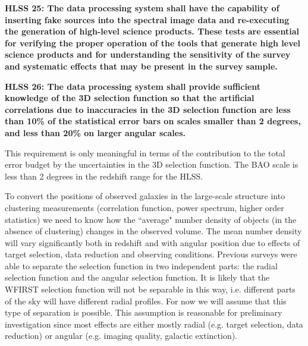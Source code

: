 \noindent
 {\bf HLSS 25: The data processing system shall have the capability of inserting fake
 sources into the spectral image data and re-executing the generation of
 high-level science products. These tests are essential for verifying the proper
 operation of the tools that generate high level science products and for
 understanding the sensitivity of the survey and systematic effects that may be
 present in the survey sample. }

 \noindent
 {\bf HLSS 26: The data processing system shall provide sufficient knowledge of the 3D
 selection function so that the artificial correlations due to inaccuracies in
 the 3D selection function are less than 10\% of the statistical error bars on
 scales smaller than 2 degrees, and less than 20\% on larger angular scales.}

 This requirement is only meaningful in terms of the contribution to the total
 error budget by the uncertainties in the 3D selection function. The BAO scale is
 less than 2 degrees in the redshift range for the HLSS.

 To convert the positions of observed galaxies in the large-scale structure
 into clustering measurements (correlation function, power spectrum, higher order
 statistics) we need to know how the ``average" number density of objects (in the
 absence of clustering) changes in the observed volume. The mean number density
 will vary significantly both in redshift and with angular position due to
 effects of target selection, data reduction and observing conditions. Previous
 surveys were able to separate the selection function in two independent parts:
 the radial selection function and the angular selection function. It is likely
 that the WFIRST selection function will not be separable in this way, i.e.
 different parts of the sky will have different radial profiles. For now we will
 assume that this type of separation is possible. This assumption is reasonable
 for preliminary investigation since most effects are either mostly radial (e.g.
 target selection, data reduction) or angular (e.g. imaging quality, galactic
 extinction).

